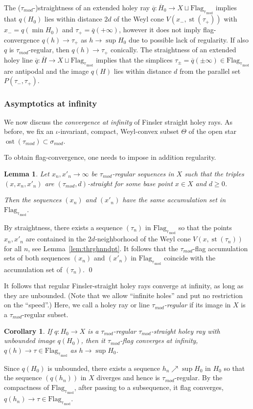 \documentclass[12pt]{article}
\theoremstyle{boldplain}
\newtheorem{cor}[equation]{Corollary}
\newtheorem{lem}[equation]{Lemma}
\theoremstyle{bolddefinition}
\numberwithin{equation}{section}
\def\si{\sigma}
\def\Flagt{\operatorname{Flag_{\tau_{mod}}}}
\def\ol{\overline}
\def\simod{\si_{mod}}
\def\st{\operatorname{st}}
\def\ost{\operatorname{ost}}
\def\taumod{\tau_{mod}}
\begin{document}
\medskip
The ($\taumod$-)straightness of an extended holey ray $\ol q:\ol H_0 \to X\sqcup\Flagt$ implies 
that $q(H_0)$ lies within distance $2d$ of the Weyl cone $V(x_-,\st(\tau_+))$
with $x_-=q(\min H_0)$ and $\tau_+=\ol q(+\infty)$,
however it does not imply flag-convergence $q(h)\to\tau_+$ as $h\to\sup H_0$
due to possible lack of regularity.
If also $q$ is $\taumod$-regular, then $q(h)\to\tau_+$ conically. 
The straightness of an extended holey line $\ol q:\ol H \to X\sqcup\Flagt$ implies 
that the simplices $\tau_{\pm}=\ol q(\pm\infty)\in\Flagt$ are antipodal and 
the image $q(H)$ lies within distance $d$ from the parallel set $P(\tau_-,\tau_+)$.



\subsubsection{Asymptotics at infinity}

We now discuss the {\em convergence at infinity} of Finsler straight holey rays. {As before, we fix an $\iota$-invariant, compact, Weyl-convex subset $\Theta$ of the open star $\ost(\taumod)\subset\simod$.} 

To obtain flag-convergence, one needs to impose in addition regularity.

\begin{lem}
\label{lem:smccstx}
Let $x_n,x'_n\to\infty$ be $\taumod$-regular sequences in $X$ 
such that the triples $(x,x_n,x'_n)$ are $(\taumod,d)$-straight for some base point $x\in X$ and $d\geq0$.

Then the sequences $(x_n)$ and $(x'_n)$ have the same accumulation set in $\Flagt$.
\end{lem}
\proof
By straightness,
there exists a sequence $(\tau_n)$ in $\Flagt$ 
so that the points $x_n,x'_n$ are contained in the $2d$-neighborhood of the Weyl cone $V(x,\st(\tau_n))$ for all $n$, 
see Lemma~\ref{lem:thrghnndpt}.
It follows that the $\taumod$-flag accumulation sets of both sequences $(x_n)$ and $(x'_n)$ in $\Flagt$
coincide with the accumulation set of $(\tau_n)$. 
\qed

\medskip
It follows that regular Finsler-straight holey rays converge at infinity,
as long as they are unbounded. 
(Note that we allow ``infinite holes'' and put no restriction on the ``speed''.) 
Here, we call a holey ray or line {\em $\taumod$-regular} if its image in $X$ is a $\taumod$-regular subset. 

\begin{cor}
\label{cor:rgstrhrcnv}
If $q:H_0\to X$ is a $\taumod$-regular $\taumod$-straight holey ray
with unbounded image $q(H_0)$,
then it $\taumod$-flag converges at infinity,
$q(h)\to\tau\in\Flagt$  as $h\to\sup H_0$.
\end{cor}
\proof
Since $q(H_0)$ is unbounded, 
there exists a sequence $h_n\nearrow\sup H_0$ in $H_0$ so that the sequence $(q(h_n))$ in $X$ diverges and hence is $\taumod$-regular.
By the compactness of $\Flagt$,
after passing to a subsequence, 
it flag converges, $q(h_n)\to\tau\in\Flagt$.
\end{document}
